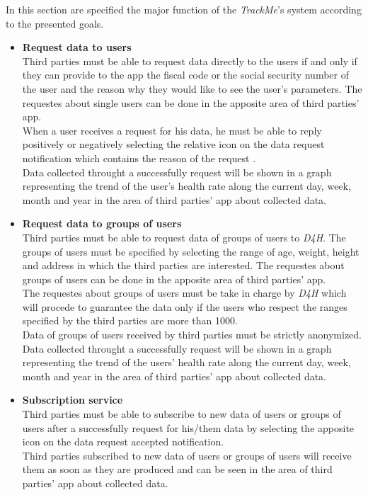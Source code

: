 In this section are specified the major function of the \textit{TrackMe}'s system according to the presented goals.
\begin {itemize}
	\item {\textbf{Request data to users}\\ Third parties must be able to request data directly to the users if and only if they can provide to the app the fiscal code or the social security number of the user and the reason why they would like to see the user's parameters. The requestes about single users can be done in the apposite area of third parties' app. \\ When a user receives a request for his data, he must be able to reply positively or negatively selecting the relative icon on the data request notification which contains the reason of the request . \\ Data collected throught a successfully request will be shown in a graph representing the trend of the user's health rate along the current day, week, month and year in the area of third parties' app about collected data. }

	\item {\textbf{Request data to groups of users}\\ Third parties must be able to request data of groups of users to \textit{D4H}. The groups of users must be specified by selecting the range of age, weight, height and address in which the third parties are interested. The requestes about groups of users can be done in the apposite area of third parties' app.  \\ The requestes about groups of users must be take in charge by \textit{D4H} which will procede to guarantee the data only if the users who respect the ranges specified by the third parties are more than 1000. \\ Data of groups of users received by third parties must be strictly anonymized. \\ Data collected throught a successfully request will be shown in a graph representing the trend of the users' health rate along the current day, week, month and year in the area of third parties' app about collected data.}

	\item {\textbf{Subscription service}\\ Third parties must be able to subscribe to new data of users or groups of users after a successfully request for his/them data by selecting the apposite icon on the data request accepted notification. \\ Third parties subscribed to new data of users or groups of users will receive them as soon as they are produced and can be seen in the area of third parties' app about collected data.}


\end{itemize}
